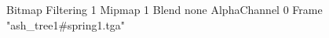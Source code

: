 {Bitmap
	{Filtering 1}
	{Mipmap 1}
	{Blend none}
	{AlphaChannel 0}
	{Frame "ash_tree1#spring1.tga"}
}
